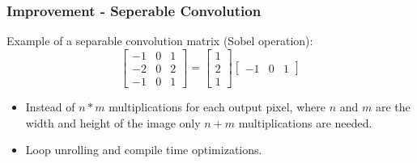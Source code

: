 \documentclass{beamer}
\begin{document}
\begin{frame}
    [fragile] \frametitle{Improvement - Seperable Convolution} Example of a separable convolution matrix (Sobel operation): $$
    \begin{bmatrix}
        -1&0&1\\-2&0&2\\-1&0&1
    \end{bmatrix}
    =
    \begin{bmatrix}
        1\\2\\1
    \end{bmatrix}
    \begin{bmatrix}
        -1&0&1
    \end{bmatrix}
    $$
    \begin{itemize}
        \item Instead of $n*m$ multiplications for each output pixel, where $n$ and $m$ are the width and height of the image only $n+m$ multiplications are needed.
        \item Loop unrolling and compile time optimizations.
    \end{itemize}
\end{frame}
\end{document}
